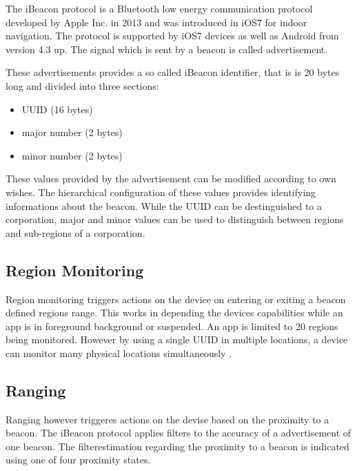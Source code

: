 The iBeacon protocol is a Bluetooth low energy communication protocol developed by Apple Inc. in 2013 and was introduced in iOS7 for indoor navigation. The protocol is supported by iOS7 devices as well as Android from version 4.3 up. The signal which is sent by a beacon is called advertisement.

These advertisements provides a so called iBeacon identifier, that is is 20 bytes long and divided into three sections:

\begin{itemize}
    \item UUID (16 bytes)
    \item major number (2 bytes)
    \item minor number (2 bytes)
\end{itemize}

These values provided by the advertisement can be modified according to own wishes.
The hierarchical configuration of these values provides identifying informations about the beacon. While the UUID can be destinguished to a corporation, major and minor values can be used to distinguish between regions and sub-regions of a corporation.


\subsection{Region Monitoring}

Region monitoring triggers actions on the device on entering or exiting a beacon defined regions range. This works in depending the devices capabilities while an app is in foreground background or suspended. An app is limited to 20 regions being monitored. However by using a single UUID in multiple locations, a device can monitor many physical locations simultaneously \cite{appleIBeacon}.


\subsection{Ranging}

Ranging however triggeres actions on the devise based on the proximity to a beacon.
The iBeacon protocol applies filters to the accuracy of a advertisement of one beacon. The filterestimation regarding the proximity to a beacon is indicated using one of four proximity states.

